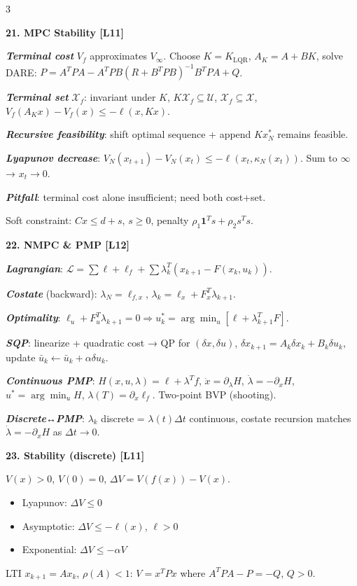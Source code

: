 \documentclass[8pt,a4paper,landscape]{extarticle}
\newcommand{\sect}[1]{\vspace{1pt}\colorbox{black!10}{\parbox{\linewidth}{\textbf{\footnotesize #1}}}\vspace{1pt}}
\newcommand{\sub}[1]{\textbf{\textit{#1}}}
\begin{document}
\begin{multicols*}{3}
\sect{21. MPC Stability \hfill {\scriptsize[L11]}}
\sub{Terminal cost} $V_f$ approximates $V_\infty$. Choose $K=K_{\text{LQR}}$, $A_K=A+BK$, solve DARE: $P=A^T PA-A^T PB(R+B^T PB)^{-1}B^T PA+Q$.

\sub{Terminal set} $\mathcal X_f$: invariant under $K$, $K\mathcal X_f\subseteq\mathcal U$, $\mathcal X_f\subseteq\mathcal X$, $V_f(A_K x)-V_f(x)\le-\ell(x,Kx)$.

\sub{Recursive feasibility}: shift optimal sequence + append $Kx_N^*$ remains feasible.

\sub{Lyapunov decrease}: $V_N(x_{t+1})-V_N(x_t)\le-\ell(x_t,\kappa_N(x_t))$. Sum to $\infty$ → $x_t\to 0$.

\sub{Pitfall}: terminal cost alone insufficient; need both cost+set.

Soft constraint: $C x\le d+s$, $s\ge 0$, penalty $\rho_1\mathbf{1}^T s+\rho_2 s^T s$.

\sect{22. NMPC \& PMP \hfill {\scriptsize[L12]}}
\sub{Lagrangian}:
$\mathcal L=\sum\ell+\ell_f+\sum\lambda_k^T(x_{k+1}-F(x_k,u_k))$.

\sub{Costate} (backward): $\lambda_N=\ell_{f,x}$, $\lambda_k=\ell_x+F_x^T\lambda_{k+1}$.

\sub{Optimality}: $\ell_u+F_u^T\lambda_{k+1}=0 \Rightarrow u_k^*=\arg\min_u[\ell+\lambda_{k+1}^T F]$.

\sub{SQP}: linearize + quadratic cost → QP for $(\delta x,\delta u)$, $\delta x_{k+1}=A_k\delta x_k+B_k\delta u_k$, update $\bar u_k\leftarrow\bar u_k+\alpha\delta u_k$.

\sub{Continuous PMP}: $H(x,u,\lambda)=\ell+\lambda^T f$, $\dot x=\partial_\lambda H$, $\dot\lambda=-\partial_x H$, $u^*=\arg\min_u H$, $\lambda(T)=\partial_x\ell_f$. Two-point BVP (shooting).

\sub{Discrete↔PMP}: $\lambda_k$ discrete = $\lambda(t)\Delta t$ continuous, costate recursion matches $\dot\lambda=-\partial_x H$ as $\Delta t\to 0$.

\sect{23. Stability (discrete) \hfill {\scriptsize[L11]}}
$V(x)>0$, $V(0)=0$, $\Delta V=V(f(x))-V(x)$.
\begin{itemize}
\item Lyapunov: $\Delta V\le 0$
\item Asymptotic: $\Delta V\le -\ell(x)$, $\ell>0$
\item Exponential: $\Delta V\le -\alpha V$
\end{itemize}
LTI $x_{k+1}=Ax_k$, $\rho(A)<1$: $V=x^T Px$ where $A^T PA-P=-Q$, $Q>0$.


\end{multicols*}
\end{document}
